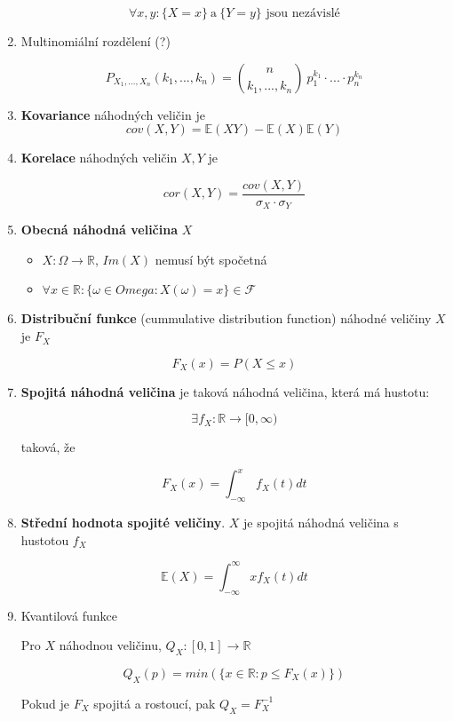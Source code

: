\documentclass[10pt,a4paper]{article}
\theoremstyle{plain}
\theoremstyle{definition}
\begin{document}
\begin{enumerate}
\[ \forall x,y: \{ X=x \} \ \text{a} \ \{Y=y\} \text{ jsou nezávislé}\]

\item Multinomiální rozdělení (?) 

\[P_{X_1, ..., X_n}(k_1, ..., k_n) = \binom{n}{k_1, ..., k_n} \  p_1^{k_1} \cdot ... \cdot p_n^{k_n} \]

\item \textbf{Kovariance} náhodných veličin je 
\[ cov(X,Y) = \mathbb{E}(XY) - \mathbb{E}(X) \mathbb{E}(Y) \]

\item \textbf{Korelace} náhodných veličin $X,Y$ je

\[ cor(X,Y) = \frac{cov(X,Y)}{\sigma_X \cdot \sigma_Y} \]

\item \textbf{Obecná náhodná veličina} $X$

\begin{itemize}
\item $X: \Omega \to \mathbb{R}$,  $Im(X)$ nemusí být spočetná
\item $\forall x \in \mathbb{R}: \{\omega \in Omega: X(\omega) = x \} \in \mathcal{F}$
\end{itemize}

\item \textbf{Distribuční funkce} (cummulative distribution function) náhodné veličiny $X$ je $F_X$

\[ F_X(x) = P(X \leq x)\]

\item \textbf{Spojitá náhodná veličina} je taková náhodná veličina, která má hustotu:

\[ \exists f_X: \mathbb{R} \to [0, \infty) \]

taková, že

\[ F_X(x) = \int^x_{-\infty} f_X(t) dt\]

\item \textbf{Střední hodnota spojité veličiny}. $X$ je spojitá náhodná veličina s hustotou $f_X$

\[ \mathbb{E}(X) = \int^{\infty}_{-\infty} x f_X(t)dt\]

\item Kvantilová funkce

Pro $X$ náhodnou veličinu, $Q_X : [0,1] \to \mathbb{R}$

\[ Q_X(p) = min(\{x \in \mathbb{R}: p \leq F_X(x) \})\]

Pokud je $F_X$ spojitá a rostoucí, pak $Q_X = F^{-1}_X$


\end{enumerate}
\end{document}
